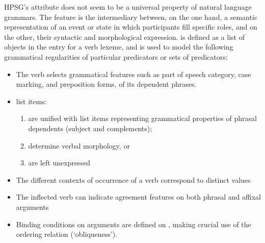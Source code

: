 \documentclass[output=paper
                ,modfonts
                ,nonflat
	        ,collection
	        ,collectionchapter
	        ,collectiontoclongg
 	        ,biblatex
                ,babelshorthands
                ,newtxmath
                ,draftmode
                ,colorlinks, citecolor=brown
]{./langsci/langscibook}
\begin{document}

HPSG's \argst attribute does not seem to be a universal property of natural
language grammars.  The \argst feature is the intermediary between, on
the one hand, a semantic representation of an event or state in which
participants fill specific roles, and on the other, their syntactic and
morphological expression.  \argst is defined as a list of 
objects in the entry for a verb lexeme, and is used to model the following grammatical regularities of particular predicators or sets of predicators:

\begin{itemize}
\item The verb selects grammatical features such as part of speech
category, case marking, and preposition forms, of its dependent
phrases.
\item \argst list items:
\begin{enumerate}
\item are unified with \val list items
representing grammatical properties of phrasal dependents (subject and
complements);
\item determine verbal morphology, or
\item are left unexpressed
\end{enumerate}
\item The different contexts of occurrence of a verb correspond to distinct \argst values
\item The inflected verb can indicate agreement features on both phrasal
and affixal arguments
\item Binding conditions on arguments are defined on \argst, making
crucial use of the ordering relation (‘obliqueness’).
\end{itemize}
\end{document}

